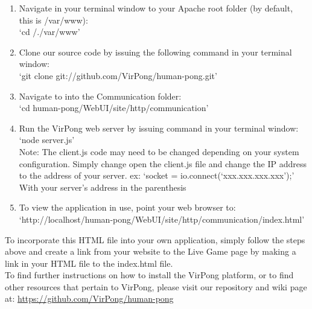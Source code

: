 		\begin{enumerate}
			\item Navigate in your terminal window to your Apache root folder (by default, this is /var/www):\\`cd /./var/www'
			\item Clone our source code by issuing the following command in your terminal window:\\`git clone git://github.com/VirPong/human-pong.git'
			\item Navigate to into the Communication folder:\\`cd human-pong/WebUI/site/http/communication'
			\item Run the VirPong web server by issuing command in your terminal window:\\`node server.js'\\Note: The client.js code may need to be changed depending on your system configuration. Simply change open the client.js file and change the IP address to the address of your server. ex: `socket = io.connect(`xxx.xxx.xxx.xxx');' With your server's address in the parenthesis
			\item To view the application in use, point your web browser to: `http://localhost/human-pong/WebUI/site/http/communication/index.html'
		\end{enumerate}
		To incorporate this HTML file into your own application, simply follow the steps above and create a link from your website to the Live Game page by making a link in your HTML file to the index.html file.\\To find further instructions on how to install the VirPong platform, or to find other resources that pertain to VirPong, please visit our repository and wiki page at: \url{https://github.com/VirPong/human-pong}
